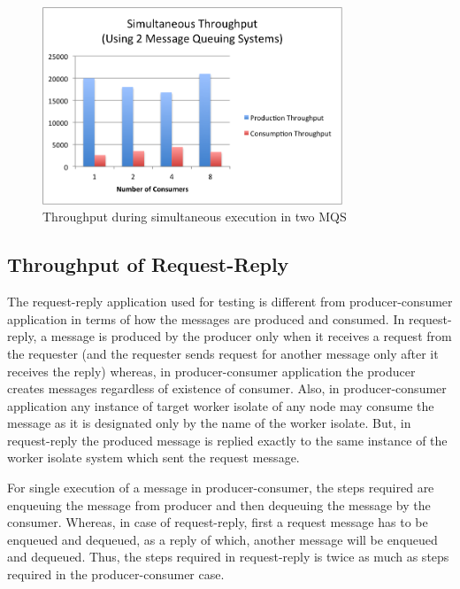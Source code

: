 \begin{figure}[H]
  \centering
  \includegraphics[width=0.8\textwidth]{figures/08simultaneous2}
  \caption[Throughput during simultaneous execution in two MQS]{Throughput during simultaneous execution in two MQS}
  \label{fig:result-simultaneous2}
\end{figure}


\subsection{Throughput of Request-Reply}
\label{subsec:request-reply}
  The request-reply application used for testing is different from producer-consumer application in terms of how the messages are produced and consumed. In request-reply, a message is produced by the producer only when it receives a request from the requester (and the requester sends request for another message only after it receives the reply) whereas, in producer-consumer application the producer creates messages regardless of existence of consumer. Also, in producer-consumer application any instance of target worker isolate of any node may consume the message as it is designated only by the name of the worker isolate. But, in request-reply the produced message is replied exactly to the same instance of the worker isolate system which sent the request message.

  For single execution of a message in producer-consumer, the steps required are enqueuing the message from producer and then dequeuing the message by the consumer. Whereas, in case of request-reply, first a request message has to be enqueued and dequeued, as a reply of which, another message will be enqueued and dequeued. Thus, the steps required in request-reply is twice as much as steps required in the producer-consumer case.

